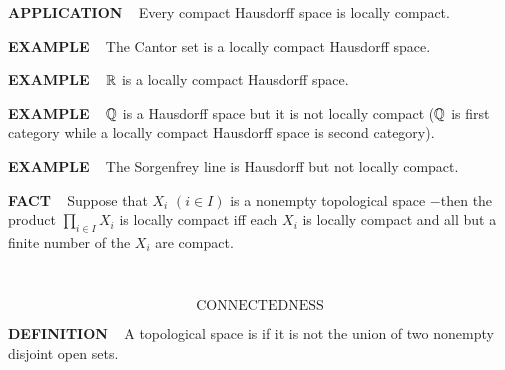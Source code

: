 \begin{x}{\small\bf APPLICATION} \ %
Every compact Hausdorff space \mX is locally compact.
\end{x}

\vspace{0.1cm}

\begin{x}{\small\bf EXAMPLE} \ %
The Cantor set is a locally compact Hausdorff space.
\end{x}

\vspace{0.1cm}

\begin{x}{\small\bf EXAMPLE} \ %
$\mathbb{R}$ is a locally compact Hausdorff space.
\end{x}

\vspace{0.1cm} 

\begin{x}{\small\bf EXAMPLE} \ %
$\mathbb{Q}$ is a Hausdorff space but it is not locally compact ($\mathbb{Q}$ is first category while a locally compact Hausdorff space is second category).
\end{x}

\vspace{0.1cm}

\begin{x}{\small\bf EXAMPLE} \ %
The Sorgenfrey line is Hausdorff but not locally compact.
\end{x}

\vspace{0.1cm}

\begin{x}{\small\bf FACT} \ %
Suppose that $X_i$ $(i \in I)$ is a nonempty topological space $-$then the product 
$\prod\limits_{i \in I} X_i$ is locally compact iff each $X_i$ is locally compact and all but a finite number of the $X_i$ are compact.
\end{x}


\newpage
\setcounter{theoremn}{0}



\ \indent 

\[
\text{CONNECTEDNESS}
\]

\begin{x}{\small\bf DEFINITION} \ %
A topological space \mX is 
if it is not the union of two nonempty disjoint open sets.
\end{x}

